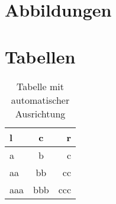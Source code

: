 \section*{Abbildungen}
\label{sec:abbildungen}


\cleardoublepage


\section*{Tabellen}
\label{sec:tabellen}

\begin{table}[htbp]
    \centering
    \caption{Tabelle mit automatischer Ausrichtung}
    \begin{tabular}{lcr}
        \toprule
        l & c   & r   \\
        \midrule
        a     & b   & c\\[0.25em]
        aa    & bb  & cc\\[0.25em]
        aaa   & bbb & ccc \\
        \bottomrule
    \end{tabular}
    \label{tab:tabelle1}
\end{table}

